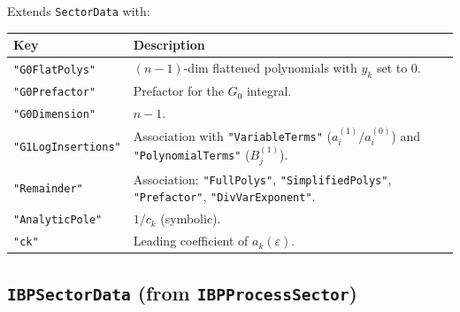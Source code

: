 \documentclass[11pt,a4paper]{article}
\begin{document}
Extends \texttt{SectorData} with:

\begin{center}
\begin{tabular}{lp{9cm}}
\toprule
\textbf{Key} & \textbf{Description} \\
\midrule
\texttt{"G0FlatPolys"} & $(n{-}1)$-dim flattened polynomials with $y_k$ set to 0. \\
\texttt{"G0Prefactor"} & Prefactor for the $G_0$ integral. \\
\texttt{"G0Dimension"} & $n - 1$. \\
\texttt{"G1LogInsertions"} & Association with \texttt{"VariableTerms"} ($a_i^{(1)}/a_i^{(0)}$) and \texttt{"PolynomialTerms"} ($B_j^{(1)}$). \\
\texttt{"Remainder"} & Association: \texttt{"FullPolys"}, \texttt{"SimplifiedPolys"}, \texttt{"Prefactor"}, \texttt{"DivVarExponent"}. \\
\texttt{"AnalyticPole"} & $1/c_k$ (symbolic). \\
\texttt{"ck"} & Leading coefficient of $a_k(\varepsilon)$. \\
\bottomrule
\end{tabular}
\end{center}

\subsection{\texttt{IBPSectorData} (from \texttt{IBPProcessSector})}
\end{document}
